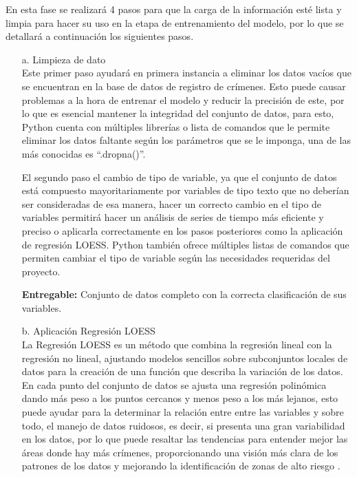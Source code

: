 En esta fase se realizará 4 pasos para que la carga de la información esté lista y limpia para hacer su uso en la etapa de entrenamiento del modelo, por lo que se detallará a continuación los siguientes pasos.

\begin{itemize}
	\item[a.] Limpieza de dato \\

Este primer paso ayudará en primera instancia a eliminar los datos vacíos que se encuentran en la base de datos de registro de crímenes. Esto puede causar problemas a la hora de entrenar el modelo y reducir la precisión de este, por lo que es esencial mantener la integridad del conjunto de datos, para esto, Python cuenta con múltiples librerías o lista de comandos que le permite eliminar los datos faltante según los parámetros que se le imponga, una de las más conocidas es “.dropna()”.

El segundo paso el cambio de tipo de variable, ya que el conjunto de datos está compuesto mayoritariamente por variables de tipo texto que no deberían ser consideradas de esa manera, hacer un correcto cambio en el tipo de variables permitirá hacer un análisis de series de tiempo más eficiente y preciso o aplicarla correctamente en los pasos posteriores como la aplicación de regresión LOESS.  Python también ofrece múltiples listas de comandos que permiten cambiar el tipo de variable según las necesidades requeridas del proyecto.

\textbf{Entregable:} Conjunto de datos completo con la correcta clasificación de sus variables.
	\item[b.] Aplicación Regresión LOESS \\
	
La Regresión LOESS	es un método que combina la regresión lineal con la regresión no lineal, ajustando modelos sencillos sobre subconjuntos locales de datos para la creación de una función que describa la variación de los datos. En cada punto del conjunto de datos se ajusta una regresión polinómica dando más peso a los puntos cercanos y menos peso a los más lejanos, esto puede ayudar para la determinar la relación entre entre las variables y sobre todo, el manejo de datos ruidosos, es decir, si presenta una gran variabilidad en los datos, por lo que puede resaltar las tendencias para entender mejor las áreas donde hay más crímenes, proporcionando una visión más clara de los patrones de los datos y mejorando la identificación de zonas de alto riesgo \parencite{gl_maxima}.


\end{itemize}
